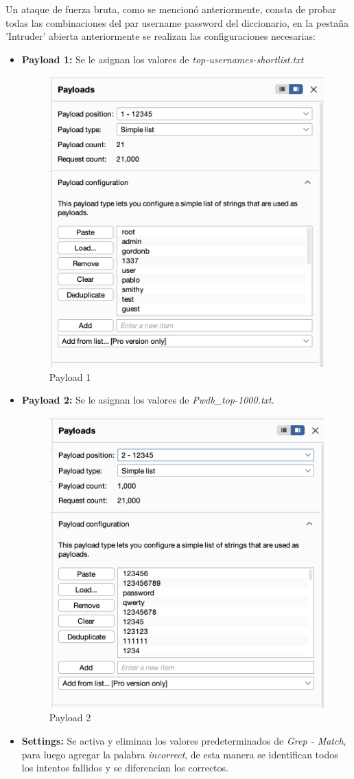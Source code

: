 \documentclass[letter,12pt]{article}
\begin{document}
Un ataque de fuerza bruta, como se mencionó anteriormente, consta de probar todas las combinaciones del par username password del diccionario, en la pestaña 'Intruder' abierta anteriormente se realizan las configuraciones necesarias:
\begin{itemize}
    \item \textbf{Payload 1:} Se le asignan los valores de \textit{top-usernames-shortlist.txt}
    \begin{figure}[H]
        \centering
        \includegraphics[width=0.5\linewidth]{Imagenes/brute_force_payload1.png}
        \caption{Payload 1}
        \label{fig:placeholder}
    \end{figure}
    \item \textbf{Payload 2:} Se le asignan los valores de \textit{Pwdb\_top-1000.txt}.
    \begin{figure}[H]
        \centering
        \includegraphics[width=0.5\linewidth]{Imagenes/brute_force_payload2.png}
        \caption{Payload 2}
        \label{fig:placeholder}
    \end{figure}
    \item \textbf{Settings:} Se activa y eliminan los valores predeterminados de \textit{Grep - Match}, para luego agregar la palabra \textit{incorrect}, de esta manera se identifican todos los intentos fallidos y se diferencian los correctos.

\end{itemize}
\end{document}
